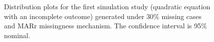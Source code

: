 	\newpage
	\begin{figure}[b]
		\begin{center}
		\end{center}
		\caption{Distribution plots for the first simulation study (quadratic equation with an incomplete outcome) generated under 30\% missing cases and MARr missingness mechanism. The confidence interval is 95\% nominal.}
		\label{fig6_2}
	\end{figure}
	
